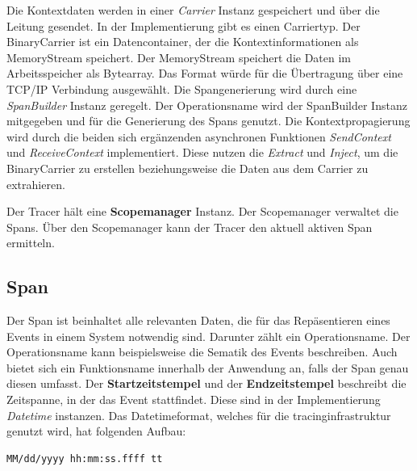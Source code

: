 Die Kontextdaten werden in einer \emph{Carrier} Instanz gespeichert und über die Leitung gesendet. In der Implementierung gibt es einen Carriertyp. Der BinaryCarrier ist ein Datencontainer, der die Kontextinformationen als MemoryStream speichert. Der MemoryStream speichert die Daten im Arbeitsspeicher als Bytearray. Das Format würde für die Übertragung über eine TCP/IP Verbindung ausgewählt. 
Die Spangenerierung wird durch eine \emph{SpanBuilder} Instanz geregelt. Der Operationsname wird der SpanBuilder Instanz mitgegeben und für die Generierung des Spans genutzt. Die Kontextpropagierung wird durch die beiden sich ergänzenden asynchronen Funktionen \emph{SendContext} und \emph{ReceiveContext} implementiert. Diese nutzen die \emph{Extract} und \emph{Inject}, um die BinaryCarrier zu erstellen beziehungsweise die Daten aus dem Carrier zu extrahieren.

Der Tracer hält eine \textbf{Scopemanager} Instanz. Der Scopemanager verwaltet die Spans. Über den Scopemanager kann der Tracer den aktuell aktiven Span ermitteln.


\subsection{Span}
\label{subsection:Span}
Der Span ist beinhaltet alle relevanten Daten, die für das Repäsentieren eines Events in einem System notwendig sind. Darunter zählt ein Operationsname. Der Operationsname kann beispielsweise die Sematik des Events beschreiben. Auch bietet sich ein Funktionsname innerhalb der Anwendung an, falls der Span genau diesen umfasst. Der \textbf{Startzeitstempel} und der \textbf{Endzeitstempel} beschreibt die Zeitspanne, in der das Event stattfindet. Diese sind in der Implementierung \emph{Datetime} instanzen. Das Datetimeformat, welches für die tracinginfrastruktur genutzt wird, hat folgenden Aufbau:

\begin{minipage}[]{\textwidth}
	\begin{lstlisting}[frame=trBL]
	MM/dd/yyyy hh:mm:ss.ffff tt
	\end{lstlisting}
	\label{listing:Tracer Verbindungsaufbau}
\end{minipage} 

